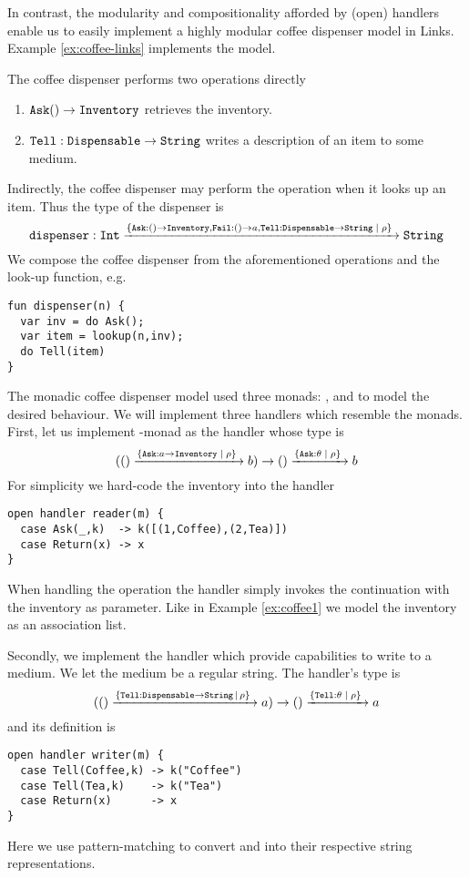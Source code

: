 In contrast, the modularity and compositionality afforded by (open) handlers enable us to easily implement a highly modular coffee dispenser model in Links. Example \ref{ex:coffee-links} implements the model.
\begin{example}\label{ex:coffee-links}
The coffee dispenser performs two operations directly
\begin{enumerate}
  \item $\texttt{Ask} () \to \texttt{Inventory}$ retrieves the inventory.
  \item $\texttt{Tell}: \texttt{Dispensable} \to \texttt{String}$ writes a description of an item to some medium.
\end{enumerate}
Indirectly, the coffee dispenser may perform the  operation when it looks up an item. Thus the type of the dispenser is 
\[ \texttt{dispenser} : \texttt{Int} \xrightarrow{\{\texttt{Ask}:() \to \texttt{Inventory}, \texttt{Fail}:() \to a,\texttt{Tell}:\texttt{Dispensable} \to \texttt{String} \; | \; \rho\}\;} \texttt{String} \]
We compose the coffee dispenser from the aforementioned operations and the look-up function, e.g.
\begin{lstlisting}[style=links]
fun dispenser(n) {
  var inv = do Ask();
  var item = lookup(n,inv);
  do Tell(item)
}
\end{lstlisting}
The monadic coffee dispenser model used three monads: ,  and  to model the desired behaviour. We will implement three handlers which resemble the monads. First, let us implement -monad as the handler  whose type is 
\[  (() \xrightarrow{\{\texttt{Ask}:a \to \texttt{Inventory} \; | \;\rho\}\;} b) \to () \xrightarrow{\{\texttt{Ask}:\theta \; | \; \rho\}\;} b \]
For simplicity we hard-code the inventory into the handler
\begin{lstlisting}[style=links]
open handler reader(m) {
  case Ask(_,k)  -> k([(1,Coffee),(2,Tea)])
  case Return(x) -> x
}
\end{lstlisting}
When handling the operation  the handler simply invokes the continuation  with the inventory as parameter. Like in Example \ref{ex:coffee1} we model the inventory as an association list.

Secondly, we implement the handler  which provide capabilities to write to a medium. We let the medium be a regular string. The handler's type is
\[  (() \xrightarrow{\{\texttt{Tell}: \texttt{Dispensable} \to \texttt{String} \, | \,\rho\}\;} a) \to () \xrightarrow{\{\texttt{Tell}:\theta \; | \; \rho\}\;} a \]
and its definition is
\begin{lstlisting}[style=links]
open handler writer(m) {
  case Tell(Coffee,k) -> k("Coffee")
  case Tell(Tea,k)    -> k("Tea")
  case Return(x)      -> x
}
\end{lstlisting}
Here we use pattern-matching to convert  and  into their respective string representations.


\end{example}
